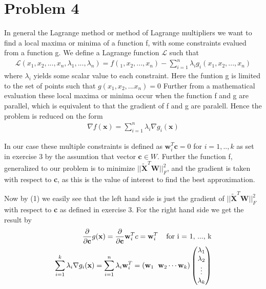 \documentclass[a4paper,norsk]{article}
\begin{document}
\section{Problem 4}
In general the Lagrange method or method of Lagrange multipliers we want to find a local maxima or minima of a function f, with some constraints evalued from a function g. 
We define a Lagrange function $\mathcal{L}$ such that 
\begin{align*}
\mathcal{L}(x_1, x_2,...,x_n, \lambda_1, ..., \lambda_n) = f(_1, x_2,...,x_n) - \sum_{i=1}^n \lambda_i g_i(x_1, x_2,...,x_n)  
\end{align*}
where $\lambda_i$ yields some scalar value to each constraint. Here the funtion g is limited to the set of points such that
$g(x_1, x_2,...x_n) = 0$
Further from a mathematical evaluation these local maxima or minima occur when the function f and g are parallel, which is equivalent to that the gradient of f and g are paralell. Hence the problem is reduced on the form
\begin{align}
\nabla f(\textbf{x}) = \sum_{i=1}^n \lambda_i \nabla g_i(\textbf{x})
\end{align}

In our case these multiple constraints is defined as $\textbf{w}_i^T \textbf{c} = 0$ for $i = 1, ..,k$ as set in exercise 3 by the assumtion that  vector $\textbf{c} \in W$. Further the function f, generalized to our problem is to minimize 
$||\tilde{\textbf{X}}^T \textbf{W} ||_F^2  $, and the gradient is taken with respect to \textbf{c}, as this is the value of interest to find the best approximation. \newline \newline

Now by (1) we easily see that the left hand side is just the gradient of $||\tilde{\textbf{X}}^T \textbf{W} ||_F^2  $
with respect to \textbf{c} as defined in exercise 3. For the right hand side we get the result by
\begin{align*}
\frac{\partial}{\partial \textbf{c}} g(\textbf{x}) = \frac{\partial}{\partial \textbf{c}} \textbf{w}_i^T c = \textbf{w}_i^T \hspace{4mm} \text{for i = 1, ..., k} \\
\sum_{i=1}^k \lambda_i \nabla g_i(\textbf{x}) = \sum_{i=1}^n \lambda_i \textbf{w}_i^T =
(\textbf{w}_1 \hspace{2mm} \textbf{w}_2 \cdots \textbf{w}_k) 
\begin{pmatrix}\lambda_{1} \\ \lambda_{2} \\ \vdots \\ \lambda_{k} \end{pmatrix}
\end{align*}
\newline \newline
\end{document}
